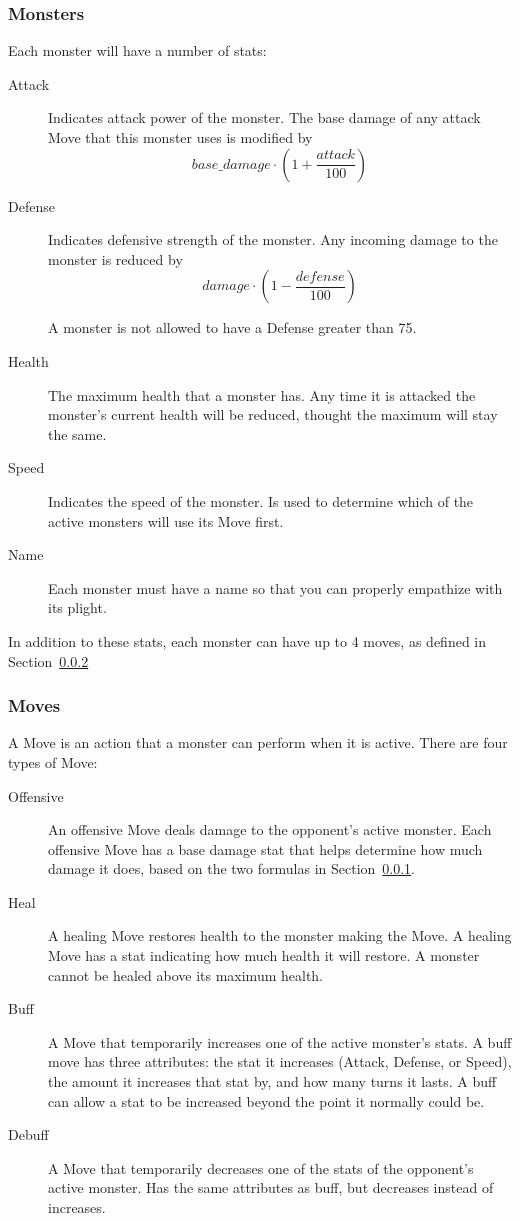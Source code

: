 \documentclass[11pt]{cselabheader}
\begin{document}
\subsubsection{Monsters}
\label{subsubsec:monster}  
Each monster will have a number of stats:
\begin{description}
\item[Attack] Indicates attack power of the monster. The base damage of any attack
  Move that this monster uses is modified by $$base\_damage \cdot \left(1 +
  \frac{attack}{100}\right)$$
\item[Defense] Indicates defensive strength of the monster. Any incoming damage to
  the monster is reduced by $$damage \cdot \left(1 - \frac{defense}{100}\right)$$

  A monster is not allowed to have a Defense greater than 75.
\item[Health] The maximum health that a monster has. Any time it is attacked the
  monster's current health will be reduced, thought the maximum will stay the same.
\item[Speed] Indicates the speed of the monster. Is used to determine which of the
  active monsters will use its Move first.
\item[Name] Each monster must have a name so that you can properly empathize with
  its plight.
\end{description}


In addition to these stats, each monster can have up to 4 moves, as defined in
Section~\ref{subsubsec:moves}

\subsubsection{Moves}
\label{subsubsec:moves}
A Move is an action that a monster can perform when it is active. There are four
types of Move:

\begin{description}
\item[Offensive] An offensive Move deals damage to the opponent's active monster.
  Each offensive Move has a base damage stat that helps determine how much damage it
  does, based on the two formulas in Section~\ref{subsubsec:monster}.
\item[Heal] A healing Move restores health to the monster making the Move. A healing
  Move has a stat indicating how much health it will restore. A monster cannot be
  healed above its maximum health.
\item[Buff] A Move that temporarily increases one of the active monster's stats. A buff move
  has three attributes: the stat it increases (Attack, Defense, or Speed), the
  amount it increases that stat by, and how many turns it lasts. A buff can allow a stat
  to be increased beyond the point it normally could be.
\item[Debuff] A Move that temporarily decreases one of the stats of the opponent's active
  monster. Has the same attributes as buff, but decreases instead of increases.
\end{description}
\end{document}
